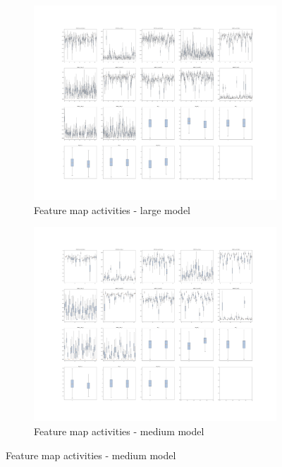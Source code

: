\begin{figure}
    \centering
    \begin{subfigure}{.7\textwidth}
        \centering
        \includegraphics[width=\textwidth]{images/sparseness/encoder_fm1_fms.png}
        \caption{Feature map activities - large model}
    \end{subfigure}
    \hfill
    \begin{subfigure}{.7\textwidth}
        \centering
        \includegraphics[width=\textwidth]{images/sparseness/encoder_fm2_fms.png}
        \caption{Feature map activities - medium model}
    \end{subfigure}
\end{figure}

